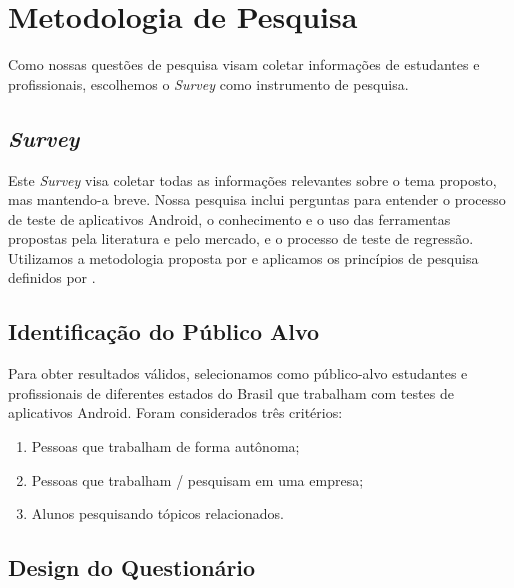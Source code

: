 \section{Metodologia de Pesquisa}\label{rmsurvey}

Como nossas questões de pesquisa visam coletar informações de estudantes e profissionais, escolhemos o \textit{Survey} como instrumento de pesquisa.

\subsection{\textit{Survey}}

Este \textit{Survey} visa coletar todas as informações relevantes sobre o tema proposto, mas mantendo-a breve. Nossa pesquisa inclui perguntas para entender o processo de teste de aplicativos Android, o conhecimento e o uso das ferramentas propostas pela literatura e pelo mercado, e o processo de teste de regressão. Utilizamos a metodologia proposta por  e aplicamos os princípios de pesquisa definidos por .

\subsection{Identificação do Público Alvo}

Para obter resultados válidos, selecionamos como público-alvo estudantes e profissionais de diferentes estados do Brasil que trabalham com testes de aplicativos Android. Foram considerados três critérios:

\begin{enumerate}
    \item Pessoas que trabalham de forma autônoma; 
    \item Pessoas que trabalham / pesquisam em uma empresa; 
    \item Alunos pesquisando tópicos relacionados.
\end{enumerate}

\subsection{Design do Questionário}

